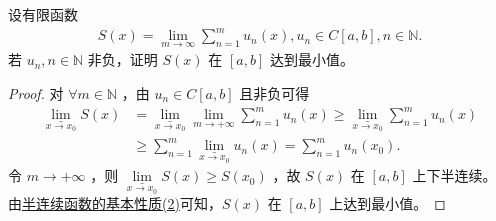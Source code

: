 \documentclass[../../main.tex]{subfiles}%
\begin{document}
\begin{example}
设有限函数
\begin{align*}
S(x) = \lim_{m \to \infty} \sum_{n=1}^{m} u_n(x),  u_n \in C[a,b],  n \in \mathbb{N}.
\end{align*}
若 $u_n, n \in \mathbb{N}$ 非负，证明 $S(x)$ 在 $[a,b]$ 达到最小值。
\end{example}
\begin{proof}
对 $\forall m\in \mathbb{N}$ ，由 $u_n\in C\left[ a,b \right]$ 且非负可得
\begin{align*}
\underset{x\rightarrow x_0}{\underline{\lim }}S\left( x \right) &= \underset{x\rightarrow x_0}{\underline{\lim }}\underset{m\rightarrow +\infty}{\lim}\sum_{n=1}^m{u_n\left( x \right)} \geqslant \underset{x\rightarrow x_0}{\underline{\lim }}\sum_{n=1}^m{u_n\left( x \right)} \\
&\geqslant \sum_{n=1}^m{\underset{x\rightarrow x_0}{\underline{\lim }}u_n\left( x \right)} = \sum_{n=1}^m{u_n\left( x_0 \right)}.
\end{align*}
令 $m\rightarrow +\infty$ ，则 $\underset{x\rightarrow x_0}{\underline{\lim }}S\left( x \right) \geqslant S\left( x_0 \right)$ ，故 $S\left( x \right)$ 在 $\left[ a,b \right]$ 上下半连续。
由\hyperref[proposition:半连续函数基本性质]{半连续函数的基本性质(2)}可知，$S\left( x \right)$ 在 $\left[ a,b \right]$ 上达到最小值。
\end{proof}
\end{document}
